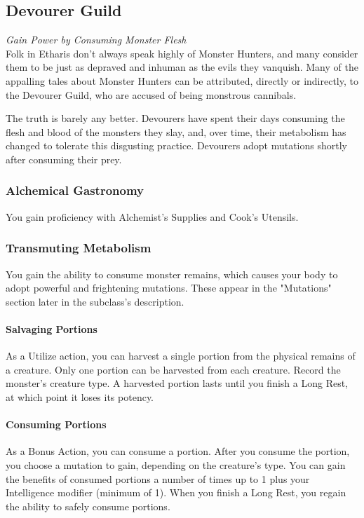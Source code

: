 \documentclass[letterpaper,openany,oneside,twocolumn]{book}
\begin{document}
\subsection*{Devourer Guild}
\textit{Gain Power by Consuming Monster Flesh}\\
Folk in Etharis don't always speak highly of Monster Hunters, and many consider them to be just as depraved and inhuman as the evils they vanquish. Many of the appalling tales about Monster Hunters can be attributed, directly or indirectly, to the Devourer Guild, who are accused of being monstrous cannibals.

The truth is barely any better. Devourers have spent their days consuming the flesh and blood of the monsters they slay, and, over time, their metabolism has changed to tolerate this disgusting practice. Devourers adopt mutations shortly after consuming their prey.
\subsubsection*{Alchemical Gastronomy}
You gain proficiency with Alchemist's Supplies and Cook's Utensils.
\subsubsection*{Transmuting Metabolism}
You gain the ability to consume monster remains, which causes your body to adopt powerful and frightening mutations. These appear in the "Mutations" section later in the subclass's description.
\paragraph*{Salvaging Portions} As a Utilize action, you can harvest a single portion from the physical remains of a creature. Only one portion can be harvested from each creature. Record the monster's creature type. A harvested portion lasts until you finish a Long Rest, at which point it loses its potency.
\paragraph*{Consuming Portions} As a Bonus Action, you can consume a portion. After you consume the portion, you choose a mutation to gain, depending on the creature's type. You can gain the benefits of consumed portions a number of times up to 1 plus your Intelligence modifier (minimum of 1). When you finish a Long Rest, you regain the ability to safely consume portions.
\end{document}
